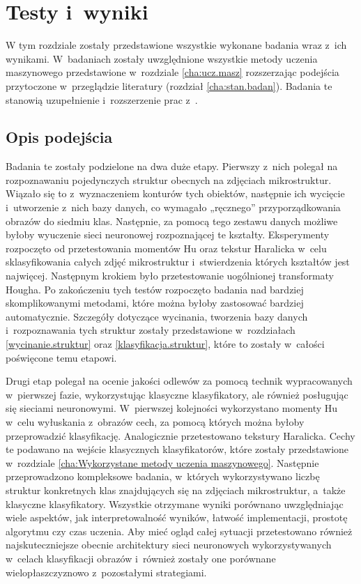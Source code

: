 \chapter{Testy i~wyniki}
\label{cha5}

W tym rozdziale zostały przedstawione wszystkie wykonane badania wraz z~ich wynikami. W~badaniach zostały uwzględnione wszystkie metody uczenia maszynowego przedstawione w~rozdziale \ref{cha:ucz.masz} rozszerzając podejścia przytoczone w~przeglądzie literatury (rozdział \ref{cha:stan.badan}). Badania te stanowią uzupełnienie i~rozszerzenie prac z~\cite{Reczek21}. 

\section{Opis podejścia}
\label{opis_podejścia}
Badania te zostały podzielone na dwa duże etapy. Pierwszy z~nich polegał na rozpoznawaniu pojedynczych struktur obecnych na zdjęciach mikrostruktur. Wiązało się to z~wyznaczeniem konturów tych obiektów, następnie ich wycięcie i~utworzenie z~nich bazy danych, co wymagało „ręcznego” przyporządkowania obrazów do siedmiu klas. Następnie, za pomocą tego zestawu danych możliwe byłoby wyuczenie sieci neuronowej rozpoznającej te kształty. Eksperymenty rozpoczęto od przetestowania momentów Hu oraz tekstur Haralicka w~celu sklasyfikowania całych zdjęć mikrostruktur i~stwierdzenia których kształtów jest najwięcej. Następnym krokiem było przetestowanie uogólnionej transformaty Hougha. Po zakończeniu tych testów rozpoczęto badania nad bardziej skomplikowanymi metodami, które można byłoby zastosować bardziej automatycznie. Szczegóły dotyczące wycinania, tworzenia bazy danych i~rozpoznawania tych struktur zostały przedstawione w~rozdziałach \ref{wycinanie.struktur} oraz \ref{klasyfikacja.struktur}, które to zostały w~całości poświęcone temu etapowi.

Drugi etap polegał na ocenie jakości odlewów za pomocą technik wypracowanych w~pierwszej fazie, wykorzystując klasyczne klasyfikatory, ale również posługując się sieciami neuronowymi. W~pierwszej kolejności wykorzystano momenty Hu w~celu wyłuskania z~obrazów cech, za pomocą których można byłoby przeprowadzić klasyfikację. Analogicznie przetestowano tekstury Haralicka. Cechy te podawano na wejście klasycznych klasyfikatorów, które zostały przedstawione w~rozdziale \ref{cha:Wykorzystane metody uczenia maszynowego}. Następnie przeprowadzono kompleksowe badania, w~których wykorzystywano liczbę struktur konkretnych klas znajdujących się na zdjęciach mikrostruktur, a~także klasyczne klasyfikatory. Wszystkie otrzymane wyniki porównano uwzględniając wiele aspektów, jak interpretowalność wyników, łatwość implementacji, prostotę algorytmu czy czas uczenia. Aby mieć ogląd całej sytuacji przetestowano również najskuteczniejsze obecnie architektury sieci neuronowych wykorzystywanych w~celach klasyfikacji obrazów i~również zostały one porównane wielopłaszczyznowo z~pozostałymi strategiami.

